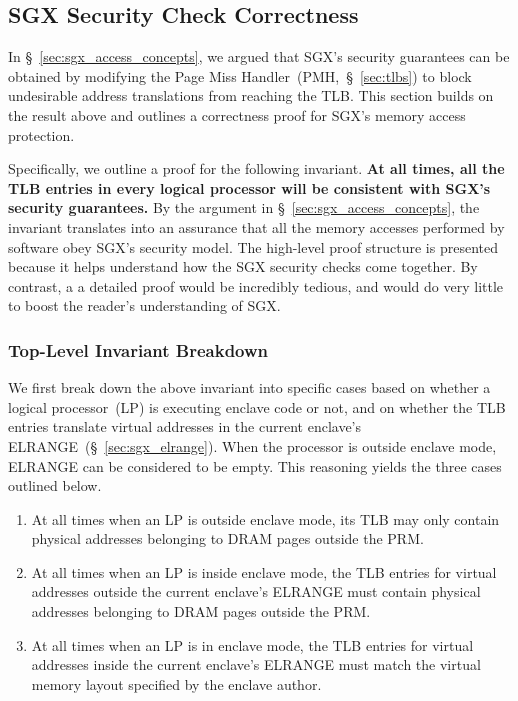 \subsection{SGX Security Check Correctness}
\label{sc:sgx_access_correctness}

In \S~\ref{sec:sgx_access_concepts}, we argued that SGX's security guarantees
can be obtained by modifying the Page Miss Handler~(PMH,~\S~\ref{sec:tlbs}) to
block undesirable address translations from reaching the TLB. This section
builds on the result above and  outlines a correctness proof for SGX's memory
access protection.

Specifically, we outline a proof for the following invariant. \textbf{At all
times, all the TLB entries in every logical processor will be consistent with
SGX's security guarantees.} By the argument in
\S~\ref{sec:sgx_access_concepts}, the invariant translates into an assurance
that all the memory accesses performed by software obey SGX's security model.
The high-level proof structure is presented because it helps understand how the
SGX security checks come together. By contrast, a a detailed proof would be
incredibly tedious, and would do very little to boost the reader's
understanding of SGX.


\subsubsection{Top-Level Invariant Breakdown}

We first break down the above invariant into specific cases based on whether
a logical processor~(LP) is executing enclave code or not, and on whether the
TLB entries translate virtual addresses in the current enclave's
ELRANGE~(\S~\ref{sec:sgx_elrange}). When the processor is outside enclave mode,
ELRANGE can be considered to be empty. This reasoning yields the three cases
outlined below.

\begin{enumerate}
\item At all times when an LP is outside enclave mode, its TLB may only contain
  physical addresses belonging to DRAM pages outside the PRM.
\item At all times when an LP is inside enclave mode, the TLB entries for
  virtual addresses outside the current enclave's ELRANGE must contain physical
  addresses belonging to DRAM pages outside the PRM.
\item At all times when an LP is in enclave mode, the TLB entries for virtual
  addresses inside the current enclave's ELRANGE must match the virtual memory
  layout specified by the enclave author.
\end{enumerate}

